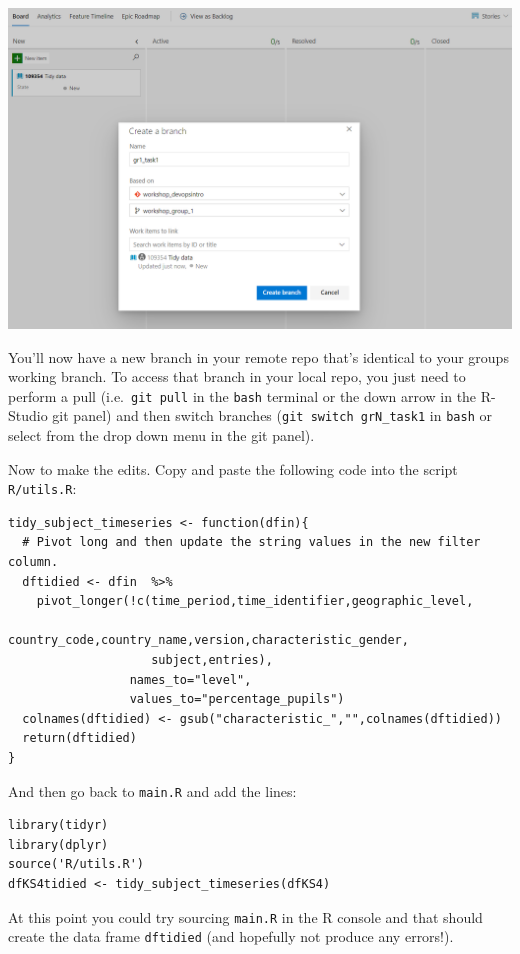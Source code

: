 \documentclass[
  12pt,
]{article}
\begin{document}
\begin{center}\includegraphics[width=0.8\linewidth]{images/DevOpsdemo/DevOps_Boards_newbranch} \end{center}

You'll now have a new branch in your remote repo that's identical to
your groups working branch. To access that branch in your local repo,
you just need to perform a pull (i.e.~\texttt{git\ pull} in the
\texttt{bash} terminal or the down arrow in the R-Studio git panel) and
then switch branches (\texttt{git\ switch\ grN\_task1} in \texttt{bash}
or select from the drop down menu in the git panel).

Now to make the edits. Copy and paste the following code into the script
\texttt{R/utils.R}:

\begin{verbatim}
tidy_subject_timeseries <- function(dfin){
  # Pivot long and then update the string values in the new filter column.
  dftidied <- dfin  %>%
    pivot_longer(!c(time_period,time_identifier,geographic_level,
                    country_code,country_name,version,characteristic_gender,
                    subject,entries),
                 names_to="level",
                 values_to="percentage_pupils")
  colnames(dftidied) <- gsub("characteristic_","",colnames(dftidied))
  return(dftidied)
}
\end{verbatim}

And then go back to \texttt{main.R} and add the lines:

\begin{verbatim}
library(tidyr)
library(dplyr)
source('R/utils.R')
dfKS4tidied <- tidy_subject_timeseries(dfKS4)
\end{verbatim}

At this point you could try sourcing \texttt{main.R} in the R console
and that should create the data frame \texttt{dftidied} (and hopefully
not produce any errors!).
\end{document}
